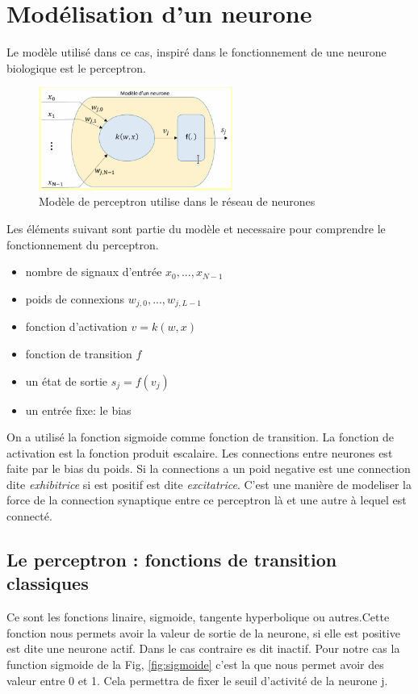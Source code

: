 \documentclass[journal]{IEEEtran}
\begin{document}
\section{Modélisation d’un neurone}
Le modèle utilisé dans ce cas, inspiré dans le fonctionnement de une neurone biologique est le perceptron.
\begin{figure}[h]
	\centering
	\includegraphics[width=2.5in]{perceptron_modelo}
	\caption{Modèle de perceptron utilise dans le réseau de neurones}
	\label{fig:perceptron_modelo}
\end{figure}
Les éléments suivant sont partie du modèle et necessaire pour comprendre le fonctionnement du perceptron.
\begin{itemize}
	\item nombre de signaux d'entrée $ x_0,...,x_{N-1} $
	\item poids de connexions $w_{j,0},...,w_{j,L-1} $
	\item fonction d'activation $v = k(w,x) $
	\item fonction de transition $ f $
	 \item un état de sortie  $s_j=f(v_j) $
	 \item un entrée fixe: le bias
\end{itemize}
On a utilisé la fonction sigmoide comme fonction de transition. La fonction de activation est la fonction produit escalaire. Les connections entre neurones est faite par le bias du poids. Si la connections a un poid negative est une connection dite \textit{exhibitrice} si est positif est dite \textit{excitatrice}. C'est une manière de modeliser la force de la connection synaptique entre ce perceptron là et une autre à lequel est connecté.


\subsection{Le perceptron : fonctions de transition classiques}
Ce sont les fonctions linaire, sigmoide, tangente hyperbolique ou autres.Cette fonction nous permets avoir la valeur de sortie de la neurone, si elle est positive est dite une neurone actif. Dans le cas contraire es dit inactif.
Pour notre cas la function sigmoide de la Fig, \ref{fig:sigmoide} c'est la que nous permet avoir des valeur entre 0 et 1. Cela permettra de fixer le seuil d'activité de la neurone j.
\end{document}

